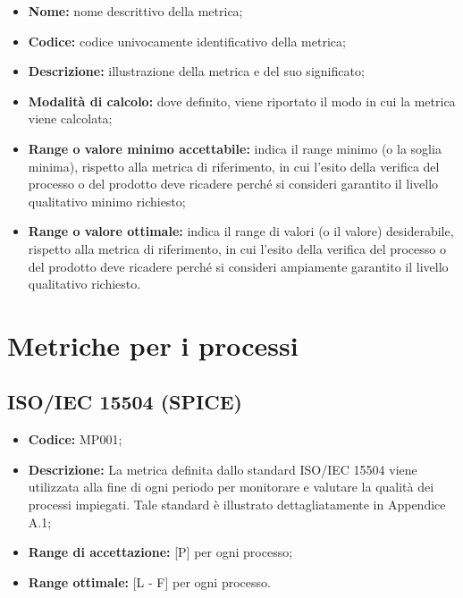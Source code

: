 \documentclass[openany,12pt,a4paper]{report}
\begin{document}
\begin{itemize}
    \item \textbf{Nome:} nome descrittivo della metrica;
    
    \item \textbf{Codice:} codice univocamente identificativo della metrica;
    
    \item \textbf{Descrizione:} illustrazione della metrica e del suo significato; 
    
    \item \textbf{Modalità di calcolo:} dove definito, viene riportato il modo in cui la metrica viene calcolata;
    
    \item \textbf{Range o valore minimo accettabile:} indica il range minimo (o la soglia minima), rispetto alla metrica di riferimento, in cui l'esito della verifica del processo o del prodotto deve ricadere perché si consideri garantito il livello qualitativo minimo richiesto;

    \item \textbf{Range o valore ottimale:} indica il range di valori (o il valore) desiderabile, rispetto alla metrica di riferimento, in cui l'esito della verifica del processo o del prodotto deve ricadere perché si consideri ampiamente garantito il livello qualitativo richiesto.
\end{itemize}


\section{Metriche per i processi}

\subsection{ISO/IEC 15504 (SPICE)}

\begin{itemize}
    \item \textbf{Codice:} MP001;
    \item \textbf{Descrizione:} La metrica definita dallo standard ISO/IEC 15504 viene utilizzata alla fine di ogni periodo per monitorare e valutare la qualità dei processi impiegati. Tale standard è illustrato dettagliatamente in Appendice A.1;
    \item \textbf{Range di accettazione:} [P] per ogni processo;
    \item \textbf{Range ottimale:} [L - F] per ogni processo.
\end{itemize}
\end{document}
